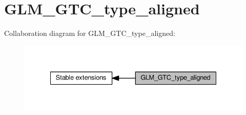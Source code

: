 \hypertarget{group__gtc__type__aligned}{}\section{G\+L\+M\+\_\+\+G\+T\+C\+\_\+type\+\_\+aligned}
\label{group__gtc__type__aligned}
Collaboration diagram for G\+L\+M\+\_\+\+G\+T\+C\+\_\+type\+\_\+aligned\+:
\nopagebreak
\begin{figure}[H]
\begin{center}
\leavevmode
\includegraphics[width=335pt]{d7/d9e/group__gtc__type__aligned}
\end{center}
\end{figure}
